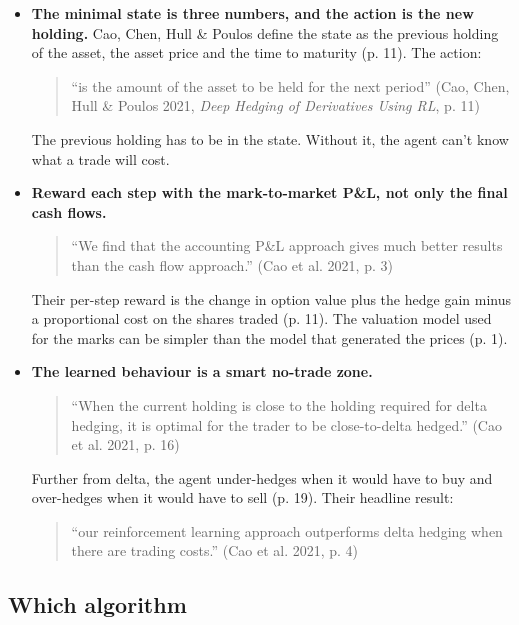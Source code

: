 \documentclass{article}
\begin{document}
\begin{itemize}
\item \textbf{The minimal state is three numbers, and the action is the new holding.} Cao, Chen, Hull \& Poulos define the state as the previous holding of the asset, the asset price and the time to maturity (p. 11). The action:

\begin{quote}``is the amount of the asset to be held for the next period'' (Cao, Chen, Hull \& Poulos 2021, \emph{Deep Hedging of Derivatives Using RL}, p. 11)\end{quote}

The previous holding has to be in the state. Without it, the agent can't know what a trade will cost.

\item \textbf{Reward each step with the mark-to-market P\&L, not only the final cash flows.}

\begin{quote}``We find that the accounting P\&L approach gives much better results than the cash flow approach.'' (Cao et al. 2021, p. 3)\end{quote}

Their per-step reward is the change in option value plus the hedge gain minus a proportional cost on the shares traded (p. 11). The valuation model used for the marks can be simpler than the model that generated the prices (p. 1).

\item \textbf{The learned behaviour is a smart no-trade zone.}

\begin{quote}``When the current holding is close to the holding required for delta hedging, it is optimal for the trader to be close-to-delta hedged.'' (Cao et al. 2021, p. 16)\end{quote}

Further from delta, the agent under-hedges when it would have to buy and over-hedges when it would have to sell (p. 19). Their headline result:

\begin{quote}``our reinforcement learning approach outperforms delta hedging when there are trading costs.'' (Cao et al. 2021, p. 4)\end{quote}

\end{itemize}

\subsection{Which algorithm}
\end{document}
